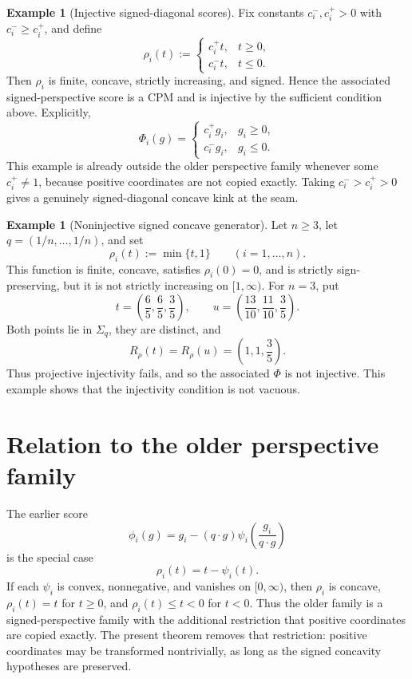 \documentclass[11pt]{article}
\theoremstyle{plain}
\theoremstyle{definition}
\newtheorem{example}[theorem]{Example}
\theoremstyle{remark}
\begin{document}
\begin{example}[Injective signed-diagonal scores]
Fix constants $c_i^-,c_i^+>0$ with $c_i^-\ge c_i^+$, and define
\[
\rho_i(t):=
\begin{cases}
 c_i^+ t, & t\ge0,\\
 c_i^- t, & t\le0.
\end{cases}
\]
Then $\rho_i$ is finite, concave, strictly increasing, and signed. Hence the associated signed-perspective score is a CPM and is injective by the sufficient condition above. Explicitly,
\[
\Phi_i(g)=
\begin{cases}
 c_i^+ g_i, & g_i\ge0,\\
 c_i^- g_i, & g_i\le0.
\end{cases}
\]
This example is already outside the older perspective family whenever some $c_i^+\ne1$, because positive coordinates are not copied exactly. Taking $c_i^->c_i^+>0$ gives a genuinely signed-diagonal concave kink at the seam.
\end{example}

\begin{example}[Noninjective signed concave generator]
Let $n\ge3$, let $q=(1/n,\ldots,1/n)$, and set
\[
\rho_i(t):=\min\{t,1\}
\qquad(i=1,\ldots,n).
\]
This function is finite, concave, satisfies $\rho_i(0)=0$, and is strictly sign-preserving, but it is not strictly increasing on $[1,\infty)$. For $n=3$, put
\[
t=\left(\frac{6}{5},\frac{6}{5},\frac{3}{5}\right),
\qquad u=\left(\frac{13}{10},\frac{11}{10},\frac{3}{5}\right).
\]
Both points lie in $\Sigma_q$, they are distinct, and
\[
R_\rho(t)=R_\rho(u)=\left(1,1,\frac{3}{5}\right).
\]
Thus projective injectivity fails, and so the associated $\Phi$ is not injective. This example shows that the injectivity condition is not vacuous.
\end{example}

\section{Relation to the older perspective family}

The earlier score
\[
\phi_i(g)=g_i-(q\cdot g)\psi_i\!\left(\frac{g_i}{q\cdot g}\right)
\]
is the special case
\[
\rho_i(t)=t-\psi_i(t).
\]
If each $\psi_i$ is convex, nonnegative, and vanishes on $[0,\infty)$, then $\rho_i$ is concave, $\rho_i(t)=t$ for $t\ge0$, and $\rho_i(t)\le t<0$ for $t<0$. Thus the older family is a signed-perspective family with the additional restriction that positive coordinates are copied exactly. The present theorem removes that restriction: positive coordinates may be transformed nontrivially, as long as the signed concavity hypotheses are preserved.
\end{document}
